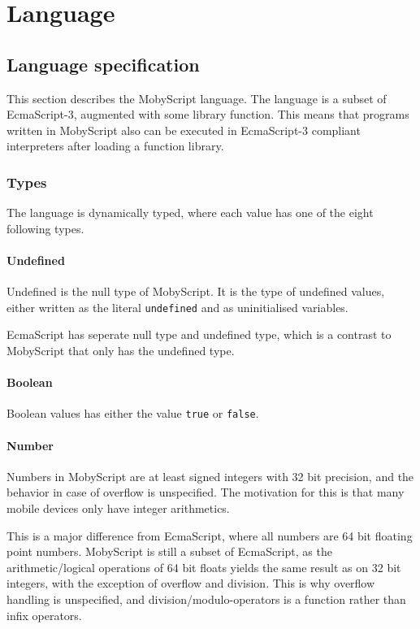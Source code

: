 \chapter{Language}
\section{Language specification}

This section describes the MobyScript language.
The language is a subset of EcmaScript-3, augmented with some library function. 
This means that programs written in MobyScript also can be executed in EcmaScript-3 compliant interpreters after loading a function library.


\subsection{Types}
The language is dynamically typed, where each value has one of the eight following types.

\subsubsection{Undefined}

Undefined is the null type of MobyScript. It is the type of undefined values, either written as the literal \verb|undefined| and as uninitialised variables.

EcmaScript has seperate null type and undefined type, which is a contrast to MobyScript that only has the undefined type. 

\subsubsection{Boolean}
Boolean values has either the value \verb|true| or \verb|false|.

\subsubsection{Number}

Numbers in MobyScript are at least signed integers with 32 bit precision, and the behavior in case of overflow is unspecified. 
The motivation for this is that many mobile devices only have integer arithmetics.

This is a major difference from EcmaScript, where all numbers are 64 bit floating point numbers. 
MobyScript is still a subset of EcmaScript, as the arithmetic/logical operations of 64 bit floats yields the same result as on 32 bit integers, with the exception of overflow and division. This is why overflow handling is unspecified, and division/modulo-operators is a function rather than infix operators.

